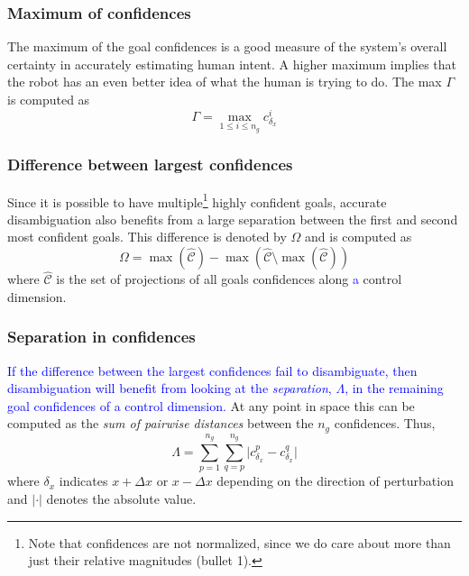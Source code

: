 \documentclass[conference]{IEEEtran}
\begin{document}
\subsubsection{Maximum of confidences}
The maximum of the goal confidences is a good measure of the system's overall certainty in accurately estimating human intent. A higher maximum implies that the robot has an even better idea of what the human is trying to do. The max $\Gamma$ is computed as
\begin{equation*}
\Gamma =\max\limits_{1 \leq i \leq n_g}c^{i}_{\delta_x}
\end{equation*}
\subsubsection{Difference between largest confidences}
Since it is possible to have multiple\footnote{Note that confidences are not normalized, since we do care about more than just their relative magnitudes (bullet 1).} highly confident goals, accurate disambiguation also benefits from a large separation between the first and second most confident goals. 
This difference is denoted by $\Omega$ and is computed as
\begin{equation*}
\Omega = \max(\hat{\mathcal{C}}) - \max(\hat{\mathcal{C}} \setminus {\max(\hat{\mathcal{C}})})
\end{equation*}
where $\hat{\mathcal{C}}$ is the set of projections of all goals confidences along \textcolor{blue}{a} control dimension.
\subsubsection{Separation in confidences}
\textcolor{blue}{If the difference between the largest confidences fail to disambiguate, then disambiguation will benefit from looking at the \textit{separation}, $\Lambda$, in the remaining goal confidences of a control dimension.} At any point in space this can be computed as the \textit{sum of pairwise distances} between the $n_g$ confidences.  Thus,
\begin{equation*}
\Lambda = \sum_{p=1}^{n_g}\sum_{q=p}^{n_g}\lvert c^{p}_{\delta_x} - c^{q}_{\delta_x}\rvert
\end{equation*}
where $\delta_x$ indicates $x+\Delta x$ or $x-\Delta x$ depending on the direction of perturbation and $\lvert\cdot\rvert$ denotes the absolute value.
\end{document}
